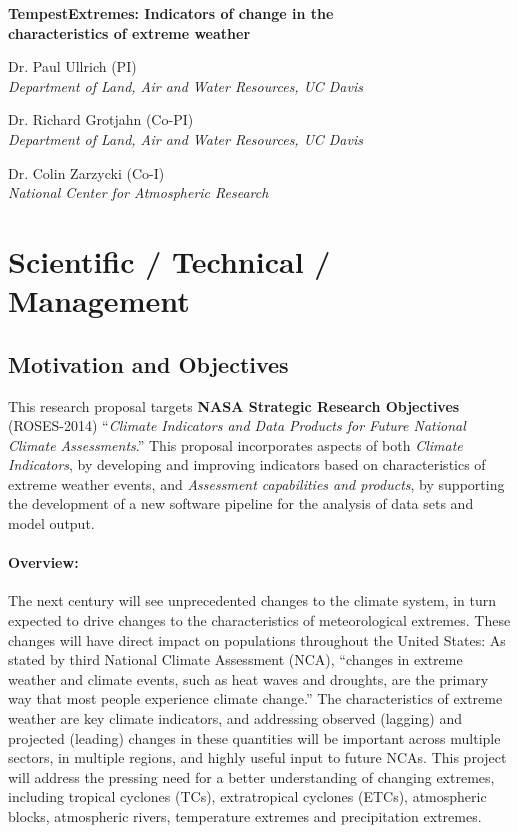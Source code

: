 \documentclass[11pt]{article}
\begin{document}
\begin{center}
{\large \textbf{TempestExtremes: Indicators of change in the \\ characteristics of extreme weather}}

Dr. Paul Ullrich (PI) \\
\textit{Department of Land, Air and Water Resources, UC Davis}

Dr. Richard Grotjahn (Co-PI) \\
\textit{Department of Land, Air and Water Resources, UC Davis}

Dr. Colin Zarzycki (Co-I) \\
\textit{National Center for Atmospheric Research}
\end{center}

\begin{spacing}{-1.0}
\tableofcontents
\end{spacing}

\clearpage

\section{Scientific / Technical / Management}

\subsection{Motivation and Objectives}

This research proposal targets \textbf{NASA Strategic Research Objectives} (ROSES-2014) ``\textit{Climate Indicators and Data Products for Future National Climate Assessments}.''  This proposal incorporates aspects of both \textit{Climate Indicators}, by developing and improving indicators based on characteristics of extreme weather events, and \textit{Assessment capabilities and products}, by supporting the development of a new software pipeline for the analysis of data sets and model output.

\paragraph{Overview:}  The next century will see unprecedented changes to the climate system, in turn expected to drive changes to the characteristics of meteorological extremes. These changes will have direct impact on populations throughout the United States: As stated by third National Climate Assessment (NCA), ``changes in extreme weather and climate events, such as heat waves and droughts, are the primary way that most people experience climate change.'' The characteristics of extreme weather are key climate indicators, and addressing observed (lagging) and projected (leading) changes in these quantities will be important across multiple sectors, in multiple regions, and highly useful input to future NCAs.  This project will address the pressing need for a better understanding of changing extremes, including tropical cyclones (TCs), extratropical cyclones (ETCs), atmospheric blocks, atmospheric rivers, temperature extremes and precipitation extremes. 
\end{document}

